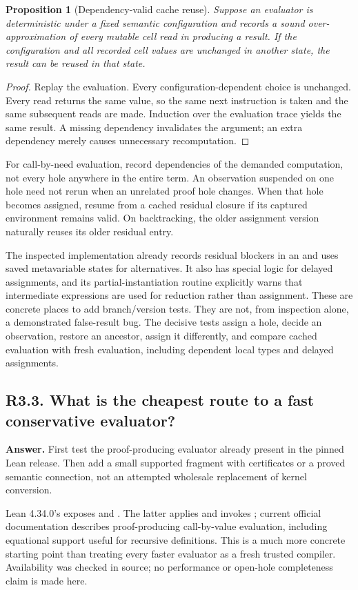 \documentclass[11pt,a4paper]{article}
\newcommand{\code}[1]{\texttt{\detokenize{#1}}}
\newcommand{\question}[2]{\subsection{#1. #2}\label{q:#1}}
\newtheorem{proposition}[theorem]{Proposition}
\theoremstyle{definition}
\theoremstyle{remark}
\begin{document}
\begin{proposition}[Dependency-valid cache reuse]\label{prop:cache}
Suppose an evaluator is deterministic under a fixed semantic configuration and records a sound over-approximation of every mutable cell read in producing a result. If the configuration and all recorded cell values are unchanged in another state, the result can be reused in that state.
\end{proposition}
\begin{proof}
Replay the evaluation. Every configuration-dependent choice is unchanged. Every read returns the same value, so the same next instruction is taken and the same subsequent reads are made. Induction over the evaluation trace yields the same result. A missing dependency invalidates the argument; an extra dependency merely causes unnecessary recomputation.
\end{proof}

For call-by-need evaluation, record dependencies of the demanded computation, not every hole anywhere in the entire term. An observation suspended on one hole need not rerun when an unrelated proof hole changes. When that hole becomes assigned, resume from a cached residual closure if its captured environment remains valid. On backtracking, the older assignment version naturally reuses its older residual entry.

The inspected implementation already records residual blockers in an \code{IO.Ref} and uses saved metavariable states for alternatives. It also has special logic for delayed assignments, and its partial-instantiation routine explicitly warns that intermediate expressions are used for reduction rather than assignment.\cite{repo-search} These are concrete places to add branch/version tests. They are not, from inspection alone, a demonstrated false-result bug. The decisive tests assign a hole, decide an observation, restore an ancestor, assign it differently, and compare cached evaluation with fresh evaluation, including dependent local types and delayed assignments.

\question{R3.3}{What is the cheapest route to a fast conservative evaluator?}

\textbf{Answer.} First test the proof-producing evaluator already present in the pinned Lean release. Then add a small supported fragment with certificates or a proved semantic connection, not an attempted wholesale replacement of kernel conversion.

Lean 4.34.0's  exposes \code{cbv} and \code{decide_cbv}. The latter applies \code{of_decide_eq_true} and invokes \code{cbvDecideGoal}; current official documentation describes proof-producing call-by-value evaluation, including equational support useful for recursive definitions.\cite{lean-cbv,lean-tactics} This is a much more concrete starting point than treating every faster evaluator as a fresh trusted compiler. Availability was checked in source; no performance or open-hole completeness claim is made here.
\end{document}
